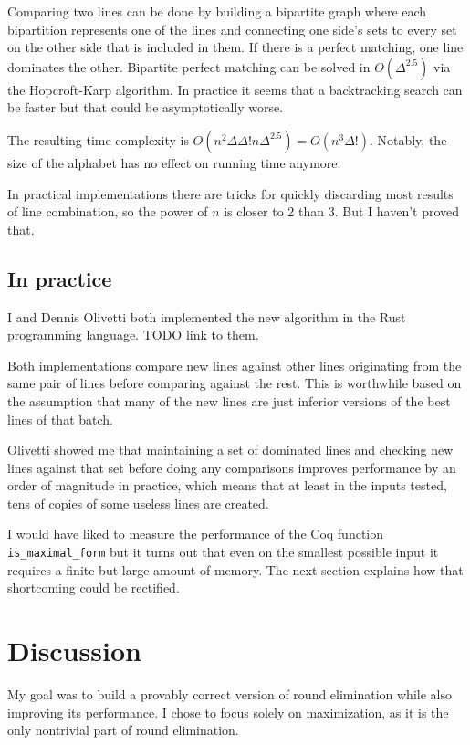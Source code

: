\documentclass[english, 12pt, a4paper, sci, a-1b, online]{aaltothesis}
\newcommand\icoq[1]{\texttt{#1}}
\begin{document}
Comparing two lines can be done by building a bipartite graph where each bipartition represents one of the lines and connecting one side's sets to every set on the other side that is included in them. If there is a perfect matching, one line dominates the other. Bipartite perfect matching can be solved in $O(\Delta^{2.5})$ via the Hopcroft-Karp algorithm. In practice it seems that a backtracking search can be faster but that could be asymptotically worse.

The resulting time complexity is $O(n^2\Delta\Delta!n\Delta^{2.5}) = O(n^3\Delta!)$. Notably, the size of the alphabet has no effect on running time anymore.

In practical implementations there are tricks for quickly discarding most results of line combination, so the power of $n$ is closer to 2 than 3. But I haven't proved that.

\subsection{In practice}

I and Dennis Olivetti both implemented the new algorithm in the Rust programming language. TODO link to them.

Both implementations compare new lines against other lines originating from the same pair of lines before comparing against the rest. This is worthwhile based on the assumption that many of the new lines are just inferior versions of the best lines of that batch.

Olivetti showed me that maintaining a set of dominated lines and checking new lines against that set before doing any comparisons improves performance by an order of magnitude in practice, which means that at least in the inputs tested, tens of copies of some useless lines are created.

I would have liked to measure the performance of the Coq function \icoq{is_maximal_form} but it turns out that even on the smallest possible input it requires a finite but large amount of memory. The next section explains how that shortcoming could be rectified.


\section{Discussion}

My goal was to build a provably correct version of round elimination while also improving its performance. I chose to focus solely on maximization, as it is the only nontrivial part of round elimination.
\end{document}
